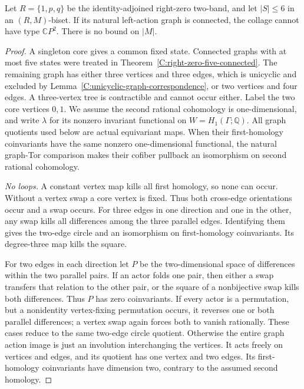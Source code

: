 \begin{theorem}
\label{C:right-zero-six-connected}
Let $R=\{1,p,q\}$ be the identity-adjoined right-zero
two-band, and let $|S|\leq6$ in an $(R,M)$-biset.
If its natural left-action graph is connected, the collage
cannot have type $\mathbb CP^2$. There is no bound on $|M|$.
\end{theorem}
\begin{proof}
A singleton core gives a common fixed state. Connected
graphs with at most five states were treated in
Theorem~\ref{C:right-zero-five-connected}.
The remaining graph has either three vertices and three
edges, which is unicyclic and excluded by
Lemma~\ref{C:unicyclic-graph-correspondence}, or two vertices
and four edges. A three-vertex tree is contractible and
cannot occur either. Label the two core vertices $0,1$.
We assume the second rational cohomology is one-dimensional,
and write $\lambda$ for its nonzero invariant functional
on $W=H_1(\Gamma;\mathbb Q)$.
All graph quotients used below are actual equivariant maps.
When their first-homology coinvariants have the same
nonzero one-dimensional functional, the natural graph-Tor
comparison makes their cofiber pullback an isomorphism on
second rational cohomology.

\emph{No loops.}
A constant vertex map kills all first homology, so none
can occur. Without a vertex swap a core vertex is fixed.
Thus both cross-edge orientations occur and a swap occurs.
For three edges in one direction and one in the other,
any swap kills all differences among the three parallel
edges. Identifying them gives the two-edge circle and an
isomorphism on first-homology coinvariants. Its degree-three
map kills the square.

For two edges in each direction let $P$ be the two-dimensional
space of differences within the two parallel pairs. If an
actor folds one pair, then either a swap transfers that
relation to the other pair, or the square of a nonbijective
swap kills both differences. Thus $P$ has zero coinvariants.
If every actor is a permutation, but a nonidentity
vertex-fixing permutation occurs, it reverses one or both
parallel differences; a vertex swap again forces both to
vanish rationally. These cases reduce to the same two-edge
circle quotient. Otherwise the entire graph action image
is just an involution interchanging the vertices. It acts
freely on vertices and edges, and its quotient has one
vertex and two edges. Its first-homology coinvariants have
dimension two, contrary to the assumed second homology.


\end{proof}
